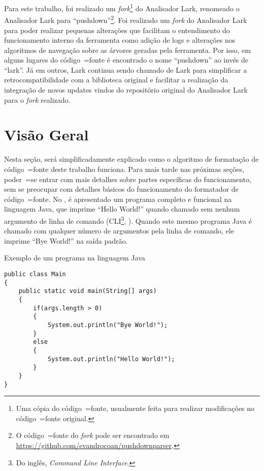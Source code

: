Para este trabalho,
foi realizado um \textit{fork}\footnote{
Uma cópia do código~=fonte,
usualmente feita para realizar modificações no código~=fonte original.
}
\cite{overviewOfGitHubForks,mayTheForkBeWithYou,collaborationAmongGitHubUsers} do Analisador Lark,
renomeado o Analisador Lark \cite{larkContextualLexer} para ``pushdown''\footnote{%
O código~=fonte do \textit{fork} pode ser encontrado em \url{https://github.com/evandrocoan/pushdownparser}.
}.
Foi realizado um \textit{fork} do Analisador Lark para poder realizar pequenas alterações que facilitam o entendimento do funcionamento interno da ferramenta como adição de logs e
alterações nos algoritmos de navegação sobre as árvores geradas pela ferramenta.
Por isso,
em alguns lugares do código~=fonte é encontrado o nome ``pushdown'' ao invés de ``lark''.
Já em outros,
Lark continua sendo chamado de Lark para simplificar a retrocompatibilidade com a biblioteca original e
facilitar a realização da integração de novos updates vindos do repositório original do Analisador Lark para o \textit{fork} realizado.


\section{Visão Geral}
\label{softwareImplementationVisaoGeral}

Nesta seção,
será simplificadamente explicado como o algoritmo de formatação de código~=fonte deste trabalho funciona.
Para mais tarde nas próximas seções,
poder~=se entrar com mais detalhes sobre partes específicas do funcionamento,
sem se preocupar com detalhes básicos do funcionamento do formatador de código~=fonte.
No ,
é apresentado um programa completo e
funcional na linguagem Java,
que imprime ``Hello World!'' quando chamado sem nenhum argumento de linha de comando (CLI\footnote{
Do inglês,
\textit{Command Line Interface}.
},
\cite{commandLineInterface}).
Quando este mesmo programa Java é chamado com qualquer número de argumentos pela linha de comando,
ele imprime ``Bye World!'' na saída padrão.
\begin{code}
\caption{Exemplo de um programa na linguagem Java}
\label{code:exemploDeUmProgramaNaLinguagemJava}
\begin{verbatim}
public class Main
{
    public static void main(String[] args)
    {
        if(args.length > 0)
        {
            System.out.println("Bye World!");
        }
        else
        {
            System.out.println("Hello World!");
        }
    }
}
\end{verbatim}
\end{code}

